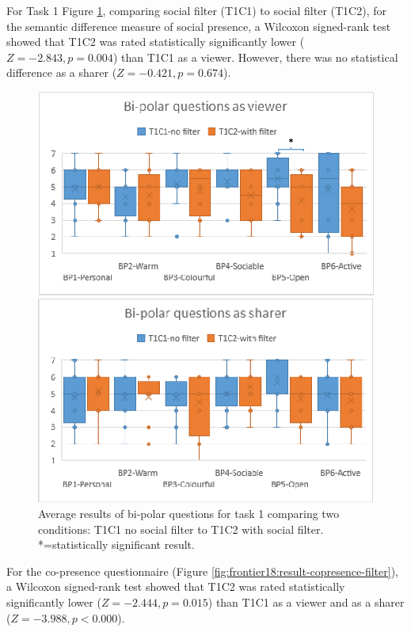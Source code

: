 For Task 1 Figure \ref{fig:frontier18:result-bipolar-filter}, comparing social filter (T1C1) to social filter (T1C2), for the semantic difference measure of social presence, a Wilcoxon signed-rank test showed that T1C2 was rated statistically significantly lower ($Z=-2.843, p=0.004$) than T1C1 as a viewer. However, there was no statistical difference as a sharer ($Z=-0.421, p=0.674$).

\begin{figure}[ht]
    \begin{center}
    \includegraphics[width=.8\linewidth]{images/54-hiding-frontier18/images-13.eps}
    \caption{Average results of bi-polar questions for task 1 comparing two conditions: T1C1 no social filter to T1C2 with social filter. *=statistically significant result.}
    \label{fig:frontier18:result-bipolar-filter}
    \end{center}
\end{figure}

For the co-presence questionnaire (Figure \ref{fig:frontier18:result-copresence-filter}), a Wilcoxon signed-rank test showed that T1C2 was rated statistically significantly lower ($Z=-2.444, p=0.015$) than T1C1 as a viewer and as a sharer ($Z=-3.988, p<0.000$).

